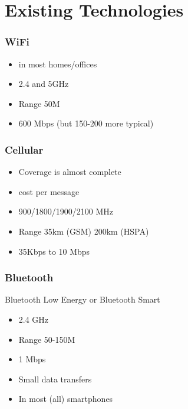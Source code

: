 \documentclass{beamer}
\begin{document}
 \section{Existing Technologies}
  \begin{frame}
  	\frametitle{WiFi}
  	\begin{itemize}
  	\item in most homes/offices
  	\item 2.4 and 5GHz
  	\item Range 50M
  	\item 600 Mbps (but 150-200 more typical)
  	\end{itemize}
  \end{frame}   
  \begin{frame}
  	\frametitle{Cellular}
  	\begin{itemize}
  	\item Coverage is almost complete
  	\item cost per message
  	\item 900/1800/1900/2100 MHz
  	\item Range 35km (GSM) 200km (HSPA) 
  	\item 35Kbps to 10 Mbps
  \end{itemize}
  \end{frame} 
  \begin{frame}
  	\frametitle{Bluetooth}
  	Bluetooth Low Energy or Bluetooth Smart
  	\begin{itemize}
  	\item 2.4 GHz
  	\item Range 50-150M 
  	\item 1 Mbps
  	\item Small data transfers
  	\item In most (all) smartphones
    \end{itemize}
  \end{frame} 
\end{document}
